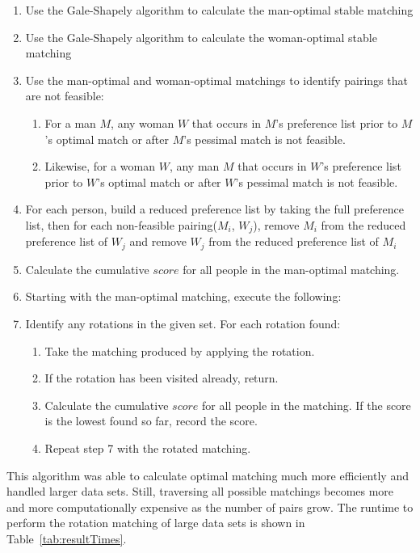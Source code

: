 \documentclass[a4paper]{article}
\begin{document}
\begin{enumerate}
    \item Use the Gale-Shapely algorithm to calculate the man-optimal stable matching
    
    \item Use the Gale-Shapely algorithm to calculate the woman-optimal stable matching
    
    \item Use the man-optimal and woman-optimal matchings to identify pairings that are not feasible:
    \begin{enumerate}
        \item For a man $M$, any woman $W$ that occurs in $M$'s preference list prior to $M$'s optimal match or after $M$'s pessimal match is not feasible.
        \item Likewise, for a woman $W$, any man $M$ that occurs in $W$'s preference list prior to $W$'s optimal match or after $W$'s pessimal match is not feasible.
    \end{enumerate}

    \item For each person, build a reduced preference list by taking the full preference list, then for each non-feasible pairing($M_i$, $W_j$), remove $M_i$ from the reduced preference list of $W_j$ and remove $W_j$ from the reduced preference list of $M_i$

    \item Calculate the cumulative $score$ for all people in the man-optimal matching.

    \item Starting with the man-optimal matching, execute the following:

    \item Identify any rotations in the given set. For each rotation found:
    \begin{enumerate}
        \item Take the matching produced by applying the rotation.
        \item If the rotation has been visited already, return.
        \item Calculate the cumulative $score$ for all people in the matching. If the score is the lowest found so far, record the score.
        \item Repeat step 7 with the rotated matching.
    \end{enumerate}
\end{enumerate}

This algorithm was able to calculate optimal matching much more efficiently and handled larger data sets. Still, traversing all possible matchings becomes more and more computationally expensive as the number of pairs grow. The runtime to perform the rotation matching of large data sets is shown in Table~\ref{tab:resultTimes}. 
\end{document}
